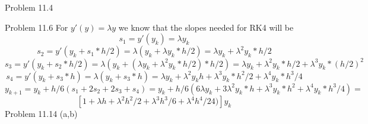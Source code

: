 \documentclass[12pt]{article}
\makeatletter
\theoremstyle{homework}
\newenvironment{exercise}[1]
{\def\@currentlabel{#1}\exercisecore}
{\endexercisecore}
\makeatother
\begin{document}
\begin{exercise}
6
Problem 11.4
\end{exercise}

\begin{exercise}
7
Problem 11.6
\end{exercise}
For $y'(y)=\lambda y$ we know that the slopes needed for RK4 will be 
$$s_1=y'(y_k)=\lambda y_k$$
$$s_2=y'(y_k+s_1*h/2)=\lambda (y_k+\lambda y_k*h/2)=\lambda y_k+\lambda^2 y_k*h/2$$
$$s_3=y'(y_k+s_2*h/2)=\lambda (y_k+(\lambda y_k+\lambda^2 y_k*h/2)*h/2)=\lambda y_k+\lambda^2 y_k*h/2+\lambda^3 y_k*(h/2)^2$$
$$s_4=y'(y_k+s_3*h)=\lambda (y_k+s_3*h)=\lambda y_k+\lambda^2 y_kh+\lambda^3 y_k*h^2/2+\lambda^4 y_k*h^3/4$$
$$y_{k+1}=y_k+h/6(s_1+2s_2+2s_3+s_4)=y_k+h/6(6\lambda y_k+3\lambda^2 y_k*h+\lambda^3 y_k*h^2+\lambda^4 y_k*h^3/4)=$$
$$[1+\lambda h +\lambda^2 h^2/2+\lambda^3 h^3/6+\lambda^4 h^4/24)]y_k$$
\begin{exercise}
8
Problem 11.14 (a,b)
\end{exercise}
\end{document}
